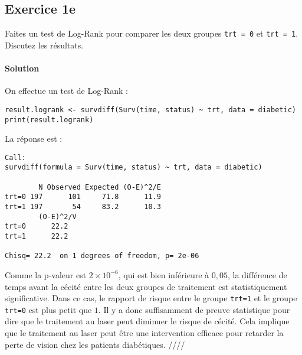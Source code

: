 \documentclass[../main.tex]{subfiles}
\begin{document}
\begin{CJK*}{UTF8}{gbsn}

\section*{Exercice 1e}
Faites un test de Log-Rank pour comparer les deux groupes \texttt{trt = 0} et \texttt{trt = 1}. 
Discutez les résultats.
    
\paragraph{Solution}
On effectue un test de Log-Rank :
    
\begin{lstlisting}
result.logrank <- survdiff(Surv(time, status) ~ trt, data = diabetic)
print(result.logrank)
\end{lstlisting}

La réponse est :

\begin{lstlisting}
Call:
survdiff(formula = Surv(time, status) ~ trt, data = diabetic)
    
        N Observed Expected (O-E)^2/E
trt=0 197      101     71.8      11.9
trt=1 197       54     83.2      10.3
        (O-E)^2/V
trt=0      22.2
trt=1      22.2
    
Chisq= 22.2  on 1 degrees of freedom, p= 2e-06 
\end{lstlisting}

Comme la p-valeur est $2 \times 10^{-6}$, qui est bien inférieure à $0,05$,
la différence de temps avant la cécité entre les deux 
groupes de traitement est statistiquement significative. 
Dans ce cas, le rapport de risque entre le groupe \texttt{trt=1}
et le groupe \texttt{trt=0} est plus petit que $1$.
Il y a donc suffisamment de preuve statistique pour dire que 
le traitement au laser peut diminuer le risque de cécité.
Cela implique que le 
traitement au laser peut être une intervention 
efficace pour retarder la perte de vision chez les patients diabétiques. ////

\end{CJK*}
\end{document}
